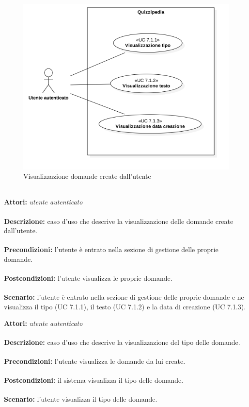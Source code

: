 \documentclass[a4paper,11pt]{article}
\begin{document}
\begin{figure}[h!]
\centering
\includegraphics[scale=0.6]{../immagini/UC7_1.png}
\caption{Visualizzazione domande create dall'utente}
\end{figure}
\ \\
\textbf{Attori:} \textit{utente autenticato}
\\ \\
\textbf{Descrizione:} caso d'uso che descrive la visualizzazione delle domande create dall'utente.\\
\\
\textbf{Precondizioni:} l'utente è entrato nella sezione di gestione delle proprie domande.\\
\\
\textbf{Postcondizioni:} l’utente visualizza le proprie domande.\\
\\
\textbf{Scenario:} l’utente è entrato nella sezione di gestione delle proprie domande e ne visualizza il tipo (UC 7.1.1), il testo (UC 7.1.2) e la data di creazione (UC 7.1.3).\\



\textbf{Attori:} \textit{utente autenticato}
\\ \\
\textbf{Descrizione:} caso d'uso che descrive la visualizzazione del tipo delle domande.\\
\\
\textbf{Precondizioni:} l'utente visualizza le domande da lui create.\\
\\
\textbf{Postcondizioni:} il sistema visualizza il tipo delle domande.\\
\\
\textbf{Scenario:} l’utente visualizza il tipo delle domande.\\
\end{document}
